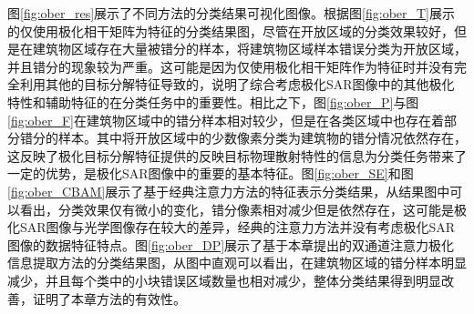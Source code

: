 图\ref{fig:ober_res}展示了不同方法的分类结果可视化图像。根据图\ref{fig:ober_T}展示的仅使用极化相干矩阵为特征的分类结果图，尽管在开放区域的分类效果较好，但是在建筑物区域存在大量被错分的样本，将建筑物区域样本错误分类为开放区域，并且错分的现象较为严重。这可能是因为仅使用极化相干矩阵作为特征时并没有完全利用其他的目标分解特征导致的，说明了综合考虑极化SAR图像中的其他极化特性和辅助特征的在分类任务中的重要性。相比之下，图\ref{fig:ober_P}与图\ref{fig:ober_F}在建筑物区域中的错分样本相对较少，但是在各类区域中也存在着部分错分的样本。其中将开放区域中的少数像素分类为建筑物的错分情况依然存在，这反映了极化目标分解特征提供的反映目标物理散射特性的信息为分类任务带来了一定的优势，是极化SAR图像中的重要的基本特征。图\ref{fig:ober_SE}和图\ref{fig:ober_CBAM}展示了基于经典注意力方法的特征表示分类结果，从结果图中可以看出，分类效果仅有微小的变化，错分像素相对减少但是依然存在，这可能是极化SAR图像与光学图像存在较大的差异，经典的注意力方法并没有考虑极化SAR图像的数据特征特点。图\ref{fig:ober_DP}展示了基于本章提出的双通道注意力极化信息提取方法的分类结果图，从图中直观可以看出，在建筑物区域的错分样本明显减少，并且每个类中的小块错误区域数量也相对减少，整体分类结果得到明显改善，证明了本章方法的有效性。


